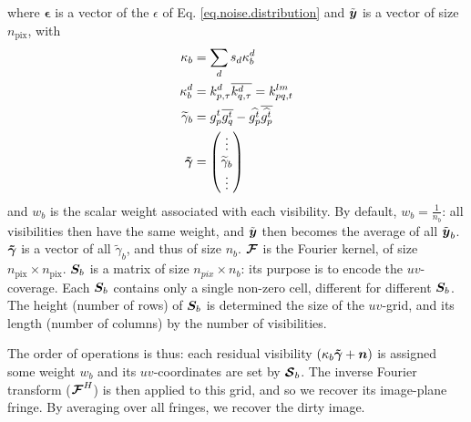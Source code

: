 
where $\bm{\epsilon}$ is a vector of the $\epsilon$ of Eq. \ref{eq.noise.distribution} and $\tilde{\bm{{{y}}}}$ is a vector of size $n_{\mathrm{pix}}$, with
\begin{align}	 
\kappa_{b} &= \sum_{d} s_{d} \kappa_{b}^{d}\label{eq.totalflux}\\
\kappa_{b}^d &= k_{p,\tau}^d \overline{k_{q,\tau}^d} = k^{lm}_{pq,t} \label{eq.kpq}\\
\widetilde{\gamma}_b &= g_p^{t}\overline{g_q^{t}}-\widehat{g_p^{t}}\overline{\widehat{g_p^{t}}} \label{eq.residuals.definition}\\
\bm{\tilde{\gamma}} &= \begin{pmatrix} \vdots \\ \widetilde{\gamma}_b \\ \vdots \end{pmatrix}
\end{align}
and $w_b$ is the scalar weight associated with each visibility. By default, $w_b = \frac{1}{n_b}$: all visibilities then have the same weight, and $\tilde{\bm{{{y}}}}$ then becomes the average of all $\tilde{\bm{{{y}}}}_b$. $\bm{\tilde{\gamma}}$ is a {vector of all $\widetilde{\gamma}_b$, and thus of size $n_b$}. $\bm{\mathcal{F}}$ is the Fourier kernel, of size $n_{\mathrm{pix}}\times n_{\mathrm{pix}}$. $\bm{S}_b$ is a matrix of size $n_{pix}\times n_b$: its purpose is to encode the $uv$-coverage. Each $\bm{S}_b$ contains only a single non-zero cell, different for different $\bm{S}_b$. The height (number of rows) of $\bm{S}_b$ is determined the size of the $uv$-grid, and its length (number of columns) by the number of visibilities. %

\pg
The order of operations is thus: each residual visibility $\left(\kappa_b \bm{\tilde{\gamma}} + \bm{n} \right)$ is assigned some weight $ w_b$ and its $uv$-coordinates are set by $\bm{\mathcal{S}}_b$. The inverse Fourier transform ($\bm{\mathcal{F}}^H$) is then applied to this grid, and so we recover its image-plane fringe. By averaging over all fringes, we recover the dirty image.

